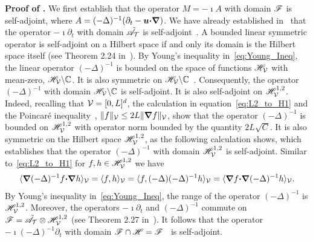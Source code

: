 \documentclass[amsa]{ipart}
\begin{document}
\textbf{Proof of .}\hspace{1ex}
%
We first establish that the operator $M=-\imath A$ with domain
$\mathscr{F}$ is
self-adjoint, where $A=(-\Delta)^{-1}(\partial_t-\boldsymbol{u}\mbox{\boldmath${\cdot}$}\mbox{\boldmath${\nabla}$})$. We have
already established 
in~ that the operator $-\imath\partial_t$ with domain
$\tilde{\mathscr{A}}_{\mathcal{T}}$ is self-adjoint~\cite{Stone:64}. A bounded
linear symmetric operator is self-adjoint on a Hilbert space if and
only its domain is the Hilbert space itself (see Theorem 2.24
in~\cite{Stone:64}). By Young's inequality in~\eqref{eq:Young_Ineq},
the linear operator $(-\Delta)^{-1}$ is bounded on the space of functions
$\mathscr{H}_{\mathcal{V}}$ with mean-zero, $\mathscr{H}_{\mathcal{V}}\backslash\mathbb{C}$. It is also symmetric on 
$\mathscr{H}_{\mathcal{V}}\backslash\mathbb{C}$~\cite{Stakgold:BVP:2000,Folland:95:PDEs}. Consequently, the operator $(-\Delta)^{-1}$ with domain $\mathscr{H}_{\mathcal{V}}\backslash\mathbb{C}$ is
self-adjoint. It is also self-adjoint on $\mathscr{H}^{1,2}_{\mathcal{V}}$. Indeed,
recalling that $\mathcal{V}=[0,L]^d$, the calculation in
equation~\eqref{eq:L2_to_H1} and the Poincar{\'e} 
inequality~\cite{McOwen:2003:PDE}, $\|f\|_{\mathcal{V}}\leq2L\|\mbox{\boldmath${\nabla}$} f\|_{\mathcal{V}}$, show that the
operator $(-\Delta)^{-1}$ is bounded on $\mathscr{H}^{1,2}_{\mathcal{V}}$ with operator norm
bounded by the quantity $2L\sqrt{C}$. It is also
symmetric on the Hilbert space $\mathscr{H}^{1,2}_{\mathcal{V}}$, as the following
calculation shows, which establishes that the operator $(-\Delta)^{-1}$
with domain $\mathscr{H}^{1,2}_{\mathcal{V}}$ is self-adjoint. Similar
to~\eqref{eq:L2_to_H1} for $f,h\in\mathscr{H}^{1,2}_{\mathcal{V}}$ we have
% 
\begin{align}
  \langle\bnabla(-\Delta)^{-1}f\bcdot\bnabla h\rangle_{\Vc}
               =\langle f,h\rangle_{\Vc}
               =\langle f,(-\Delta)(-\Delta)^{-1}h\rangle_{\Vc}
               =\langle\bnabla f\bcdot\bnabla(-\Delta)^{-1}h\rangle_{\Vc}.
\end{align}
%
By Young's inequality in~\eqref{eq:Young_Ineq}, the range of the
operator $(-\Delta)^{-1}$ is $\mathscr{H}^{1,2}_{\mathcal{V}}$. Moreover, the operators
$-\imath\partial_t$ and $(-\Delta)^{-1}$ commute on
$\mathscr{F}=\tilde{\mathscr{A}}_{\mathcal{T}}\otimes\mathscr{H}^{1,2}_{\mathcal{V}}$ (see Theorem 2.27
in~\cite{Folland:99:RealAnalysis}). It follows that the operator
$-\imath(-\Delta)^{-1}\partial_t$ with domain $\mathscr{F}\cap\mathscr{H}=\mathscr{F}$~\cite{Stone:64} is
self-adjoint.   
\end{document}
